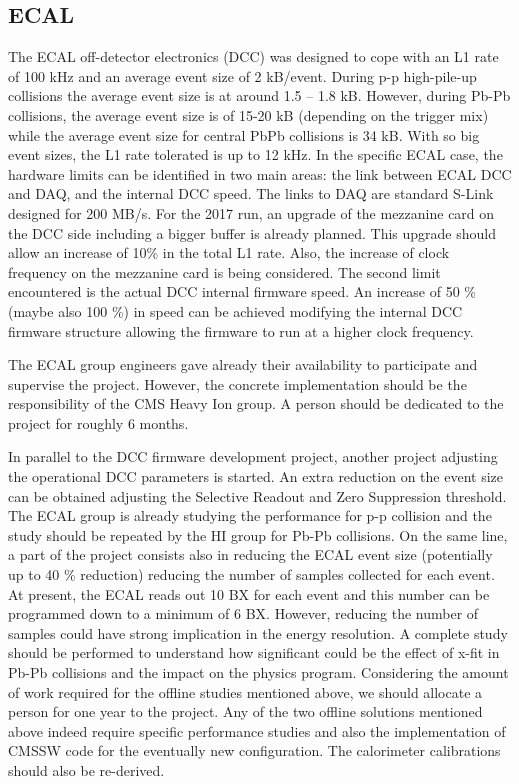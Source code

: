 \subsection{ECAL\label{subsec:ECAL}} 
The ECAL off-detector electronics (DCC) was designed to cope with an L1 rate of 100 kHz and an average event size of 2 kB/event. During p-p high-pile-up collisions the average event size is at around 1.5 – 1.8 kB. However, during Pb-Pb collisions, the average event size is of 15-20 kB (depending on the trigger mix) while the average event size for central PbPb collisions is 34 kB. With so big event sizes, the L1 rate tolerated is up to 12 kHz. In the specific ECAL case, the hardware limits can be identified in two main areas: the link between ECAL DCC and DAQ, and the internal DCC speed. The links to DAQ are standard S-Link designed for 200 MB/s. For the 2017 run, an upgrade of the mezzanine card on the DCC
side including a bigger buffer is already planned. This upgrade should allow an increase of 10\% in the total L1 rate. Also, the increase of clock frequency on the mezzanine card is being considered. The second limit encountered is the actual DCC internal firmware speed. An increase of 50 \% (maybe also 100 \%) in speed can be achieved modifying the internal DCC firmware structure allowing the firmware to run at a higher clock frequency. 

The ECAL group engineers gave already their availability to participate and supervise the project. However, the concrete implementation should be the responsibility of the CMS Heavy Ion group. A person should be dedicated to the project for roughly 6 months. 

In parallel to the DCC firmware development project, another project adjusting the operational DCC parameters is started. An extra reduction on the event size can be obtained adjusting the Selective Readout and Zero Suppression threshold. The ECAL group is already studying the performance for p-p collision and the study should be repeated by the HI group for Pb-Pb collisions. On the same line, a part of the project consists also in reducing the ECAL event size (potentially up to 40 \% reduction) reducing the number of samples collected for each event. At present, the ECAL reads out 10 BX for each event
and this number can be programmed down to a minimum of 6 BX. However, reducing the number of samples could have strong implication in the energy resolution. A complete study should be performed to understand how significant could be the effect of x-fit in Pb-Pb collisions and the impact on the physics program. Considering the amount of work required for the offline studies mentioned above, we should allocate a person for one year to the project. Any of the two offline solutions mentioned above indeed require specific performance studies and also the implementation of CMSSW code for the eventually new configuration. The calorimeter calibrations should also be re-derived. 





